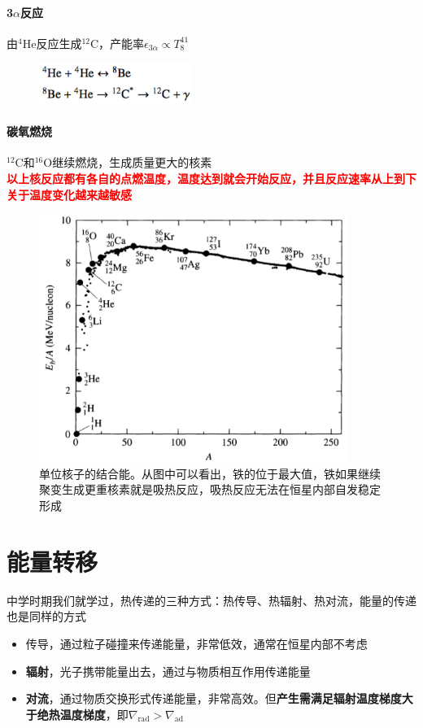 \documentclass[openany]{ctexbook}
\begin{document}
\paragraph{3$\alpha$反应}
由$^4$He反应生成$^{12}$C，产能率$\epsilon_{3\alpha}\propto T_8^{41}$
\begin{figure}[hbt]
  \centering
  \includegraphics[width=5cm]{chapters/10/3alpha}
  \label{}
\end{figure}



\paragraph{碳氧燃烧}
$^{12}$C和$^{16}$O继续燃烧，生成质量更大的核素\\
\newline
\textcolor{red}{\bf 以上核反应都有各自的点燃温度，温度达到就会开始反应，并且反应速率从上到下关于温度变化越来越敏感}

\begin{figure}[hbt]
  \centering
  \includegraphics[width=10cm]{chapters/10/bindingenergy}
  \caption{单位核子的结合能。从图中可以看出，铁的位于最大值，铁如果继续聚变生成更重核素就是吸热反应，吸热反应无法在恒星内部自发稳定形成}
  \label{}
\end{figure}



\section{能量转移}
中学时期我们就学过，热传递的三种方式：热传导、热辐射、热对流，能量的传递也是同样的方式
\begin{itemize}
  \item 传导，通过粒子碰撞来传递能量，非常低效，通常在恒星内部不考虑
  \item \textbf{辐射}，光子携带能量出去，通过与物质相互作用传递能量
  \item \textbf{对流}，通过物质交换形式传递能量，非常高效。但\textbf{产生需满足辐射温度梯度大于绝热温度梯度}，即$\nabla_\mathrm{rad}>\nabla_\mathrm{ad}$
\end{itemize}
\end{document}
